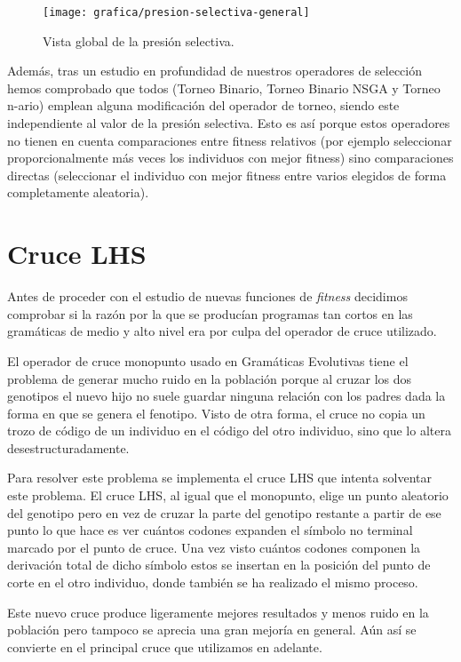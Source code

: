 \begin{figure}[H]
\centering
\texttt{[image: grafica/presion-selectiva-general]}
\caption{Vista global de la presión selectiva.}
\end{figure}

Además, tras un estudio en profundidad de nuestros operadores de selección hemos comprobado que todos (Torneo Binario, Torneo Binario NSGA y Torneo n-ario) emplean alguna modificación del operador de torneo, siendo este independiente al valor de la presión selectiva. Esto es así porque estos operadores no tienen en cuenta comparaciones entre fitness relativos (por ejemplo seleccionar proporcionalmente más veces los individuos con mejor fitness) sino comparaciones directas (seleccionar el individuo con mejor fitness entre varios elegidos de forma completamente aleatoria).

\section{Cruce LHS}
Antes de proceder con el estudio de nuevas funciones de \textit{fitness} decidimos comprobar si la razón por la que se producían programas tan cortos en las gramáticas de medio y alto nivel era por culpa del operador de cruce utilizado.

El operador de cruce monopunto usado en Gramáticas Evolutivas tiene el problema de generar mucho ruido en la población porque al cruzar los dos genotipos el nuevo hijo no suele guardar ninguna relación con los padres dada la forma en que se genera el fenotipo. Visto de otra forma, el cruce no copia un trozo de código de un individuo en el código del otro individuo, sino que lo altera desestructuradamente.

Para resolver este problema se implementa el cruce LHS que intenta solventar este problema. El cruce LHS, al igual que el monopunto, elige un punto aleatorio del genotipo pero en vez de cruzar la parte del genotipo restante a partir de ese punto lo que hace es ver cuántos codones expanden el símbolo no terminal marcado por el punto de cruce. Una vez visto cuántos codones componen la derivación total de dicho símbolo estos se insertan en la posición del punto de corte en el otro individuo, donde también se ha realizado el mismo proceso.

Este nuevo cruce produce ligeramente mejores resultados y menos ruido en la población pero tampoco se aprecia una gran mejoría en general. Aún así se convierte en el principal cruce que utilizamos en adelante.

